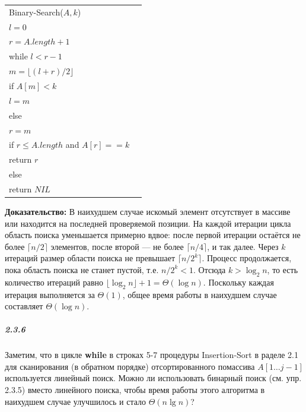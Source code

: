 \begin{tabular}{ll}
Binary-Search($A, k$) & \\
\quad $l = 0$ & \\
\quad $r = A.length + 1$ & \\
\quad while $l < r - 1$ & \\
\quad \quad $m = \lfloor (l + r)/2 \rfloor$ & \\
\quad \quad if $A[m] < k$ & \\ 
\quad \quad \quad $l = m$ & \\ 
\quad \quad else & \\
\quad \quad \quad $r = m$ & \\
\quad if $r \le A.length$ and $A[r] == k$ & \\
\quad \quad return $r$ & \\
\quad else & \\
\quad \quad return $NIL$ &
\end{tabular}

\textbf{Доказательство:}
В наихудшем случае искомый элемент отсутствует в массиве или находится на последней проверяемой позиции. 
На каждой итерации цикла область поиска уменьшается примерно вдвое:
после первой итерации остаётся не более $\lceil n/2 \rceil$ элементов, после второй — не более $\lceil n/4 \rceil$, и так далее.
Через $k$ итераций размер области поиска не превышает $\lceil n / 2^k \rceil$.
Процесс продолжается, пока область поиска не станет пустой, т.е. $n / 2^k < 1$.
Отсюда $k > \log_2 n$, то есть количество итераций равно $\lfloor \log_2 n \rfloor + 1 = \Theta(\log n)$.
Поскольку каждая итерация выполняется за $\Theta(1)$, общее время работы в наихудшем случае составляет $\Theta(\log n)$.

\subparagraph{2.3.6}
Заметим, что в цикле \textbf{while} в строках 5-7 процедуры Insertion-Sort в раделе 2.1 для сканирования (в обратном порядке) отсортированного помассива $A[1 \ldots j -1]$ используется линейный поиск. 
Можно ли использовать бинарный поиск (см. упр. 2.3.5) вместо линейного поиска, чтобы время работы этого алгоритма в наихудшем случае улучшилось и стало $\Theta(n\lg{n})$? 